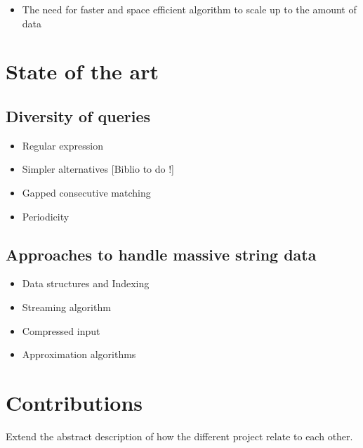 

\begin{itemize}
\item The need for faster and space efficient algorithm to scale up to the amount of data
\end{itemize}

\section{State of the art}

\subsection{Diversity of queries}
\begin{itemize}
\item Regular expression
\item Simpler alternatives [Biblio to do !]
\item Gapped consecutive matching
\item Periodicity
\end{itemize}

\subsection{Approaches to handle massive string data}

\begin{itemize}
\item Data structures and Indexing
\item Streaming algorithm
\item Compressed input
\item Approximation algorithms
\end{itemize}

\section{Contributions}

Extend the abstract description of how the different project relate to each other.
